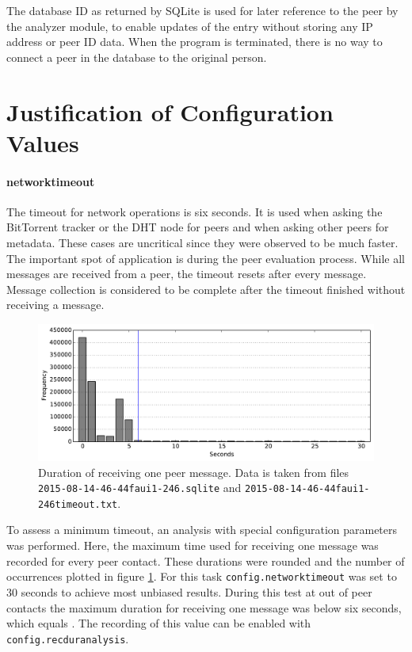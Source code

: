 \documentclass[10pt, a4paper, twoside=false, headsepline]{scrbook}
\renewcommand{\_}{\origunderscore\allowbreak}
\newcommand{\config}[1]{\texttt{config.\allowbreak #1}}
\begin{document}
The database ID as returned by SQLite is used for later reference to the peer by the analyzer module, to enable updates of the entry without storing any IP address or peer ID data. When the program is terminated, there is no way to connect a peer in the database to the original person.

\section{Justification of Configuration Values}
\label{config}
\paragraph{network\_timeout}
The timeout for network operations is six seconds. It is used when asking the BitTorrent tracker or the DHT node for peers and when asking other peers for metadata. These cases are uncritical since they were observed to be much faster. The important spot of application is during the peer evaluation process. While all messages are received from a peer, the timeout resets after every message. Message collection is considered to be complete after the timeout finished without receiving a message.

\begin{figure}
\centering
\includegraphics[width=\textwidth]{../result/2015-08-14_17-46-44_faui1-246_timeout}
\caption[Duration of receiving one peer message]{Duration of receiving one peer message. Data is taken from files \texttt{2015-08-14\_17-46-44\_faui1-246.sqlite} and \texttt{2015-08-14\_17-46-44\_faui1-246\_timeout.txt}.}
\label{timeout-calibration}
\end{figure}

To assess a minimum timeout, an analysis with special configuration parameters was performed. Here, the maximum time used for receiving one message was recorded for every peer contact. These durations were rounded and the number of occurrences plotted in figure \ref{timeout-calibration}. For this task \config{network\_timeout} was set to 30 seconds to achieve most unbiased results. During this test at  out of  peer contacts the maximum duration for receiving one message was below six seconds, which equals . The recording of this value can be enabled with \config{rec\_dur\_analysis}.
\end{document}
